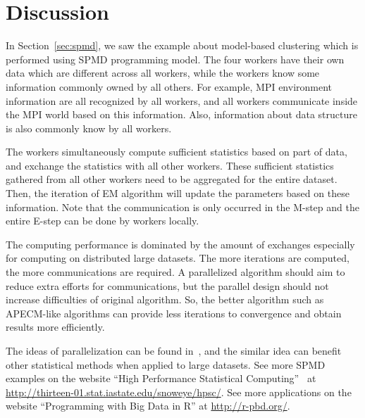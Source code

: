 \section[Discussion]{Discussion}
\label{sec:discussion}

In Section~\ref{sec:spmd}, we saw the example about model-based clustering
which is performed using SPMD programming model.
The four workers have their own data which are different across all workers,
while the workers know some information commonly owned by all others.
For example, MPI environment information are all recognized by all workers,
and all workers communicate inside the MPI world based on this information.
Also, information about data structure is also commonly know by all workers.

The workers simultaneously compute sufficient statistics based on part of data,
and exchange the statistics with all other workers.
These sufficient statistics gathered from all other workers
need to be aggregated for the entire dataset.
Then, the iteration of EM algorithm will update the parameters
based on these information.
Note that the communication is only occurred in the M-step and the
entire E-step can be done by workers locally.

The computing performance is dominated by the amount of exchanges especially
for computing on distributed large datasets.
The more iterations are computed, the more communications are required.
A parallelized algorithm should aim to reduce extra efforts for
communications, but the parallel design should not increase difficulties
of original algorithm.
So, the better algorithm such as APECM-like algorithms can provide
less iterations to convergence and obtain results more efficiently.

The ideas of parallelization can be found in~\citet{Chen2013},
and the similar idea can benefit other statistical methods when
applied to large datasets.
See more SPMD examples on the website
``High Performance Statistical Computing''~\citep{hpsc2012} at
\url{http://thirteen-01.stat.iastate.edu/snoweye/hpsc/}.
See more applications on the website
``Programming with Big Data in R'' at
\url{http://r-pbd.org/}.
